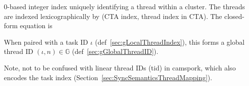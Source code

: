 
0-based integer index uniquely identifying a thread within a cluster.
The threads are indexed lexicographically by (CTA index, thread index in CTA).
The closed-form equation is 

When paired with a task ID $\iota$ (def~\ref{sec:gLocalThreadIndex}), this forms a global thread ID $(\iota, n) \in \mathbb{G}$ (def~\ref{sec:gGlobalThreadID}).

Note, not to be confused with linear thread IDs (tid) in camspork, which also encodes the task index (Section~\ref{sec:SyncSemanticsThreadMapping}).

